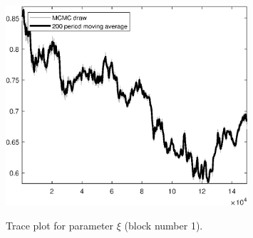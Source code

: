 \begin{figure}[H]
\centering
  \includegraphics[width=0.8\textwidth]{BRS_sectoral_KK/graphs/TracePlot_xi_blck_1}\\
    \caption{Trace plot for parameter $\xi$ (block number 1).}
\end{figure}
